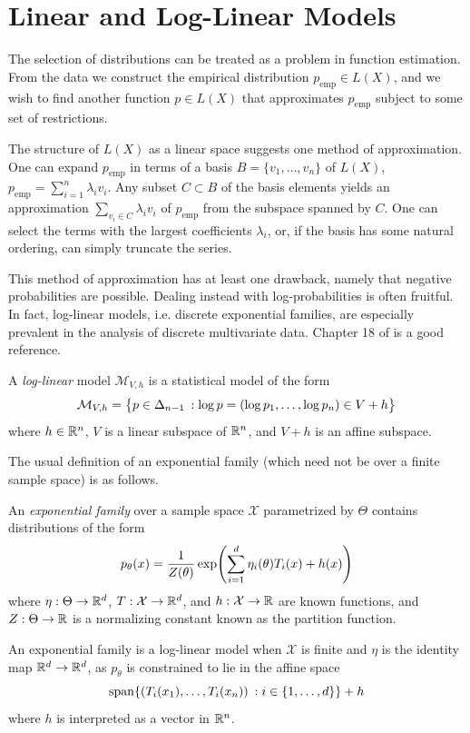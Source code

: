 \documentclass[cclicense]{hmcthesis}
\providecommand*{\xs}{\mathcal X}
\providecommand*{\ms}{\mathcal M}
\newcommand*{\emp}{\mathrm{emp}}
\numberwithin{equation}{chapter}
\numberwithin{thmcounter}{chapter}
\begin{document}
\section{Linear and Log-Linear Models}
    \label{sec:linear-models}
    
    The selection of distributions can be treated as a problem in function
    estimation.  From the data we construct the empirical distribution \mbox{$p_\emp
    \in L(X)$}, and we wish to find another function $p \in L(X)$ that
    approximates $p_\emp$ subject to some set of restrictions.  
    
    The structure of $L(X)$ as a linear space suggests one method of
    approximation.  One can expand $p_\emp$ in terms of a basis $B = \{v_1,
    \ldots, v_n\}$ of $L(X)$, $p_\emp = \sum_{i=1}^n \lambda_i v_i$.  Any subset
    $C \subset B$ of the basis elements yields an approximation $\sum_{v_i \in
    C} \lambda_i v_i$ of $p_\emp$ from the subspace spanned by $C$.  One can
    select the terms with the largest coefficients $\lambda_i$, or, if the basis
    has some natural ordering, can simply truncate the series.

    This method of approximation has at least one drawback, namely that negative
    probabilities are possible.  Dealing instead with log-probabilities is often
    fruitful.  In fact, log-linear models, i.e. discrete exponential families,
    are especially prevalent in the analysis of discrete multivariate data.
    Chapter 18 of \citep{AOS} is a good reference.
    \begin{definition}
        A \emph{log-linear} model $\ms_{V,h}$ is a statistical model of the form
        \[
            \ms_{V,h} = \cdel[\big]{p \in \Delta_{n-1} \:: \log p = (\log p_1, \ldots,
            \log p_n) \in V + h}
        \]
        where $h \in \mathbb{R}^n$, $V$ is a linear subspace of $\mathbb{R}^n$, and $V + h$ is
        an affine subspace.
    \end{definition}

    The usual definition of an exponential family (which need not be over a
    finite sample space) is as follows.
    \begin{definition}
        An \emph{exponential family} over a sample space $\xs$ parametrized by
        $\Theta$ contains distributions of the form
        \[
            p_\theta(x) = 
            \frac 1 {Z(\theta)}
            \exp\pdel*{
                \displaystyle \sum_{i=1}^d \eta_i(\theta)T_i(x) + h(x)
            }
        \]
        where $\eta : \Theta \to \mathbb{R}^d$, $T:\xs \to \R^d$, and $h: \xs \to \R$
        are known functions, and $Z:\Theta \to \mathbb{R}$ is a normalizing constant
        known as the partition function.
    \end{definition}
    An exponential family is a log-linear model when $\xs$ is finite and $\eta$
    is the identity map $\mathbb{R}^d \to \mathbb{R}^d$, as $p_\theta$ is constrained to lie in
    the affine space
    \[
        \mathrm{span}\cdel*{
            (T_i(x_1), \ldots, T_i(x_n)) \:: i \in \{1, \ldots, d\}
        } + h
    \]
    where $h$ is interpreted as a vector in $\mathbb{R}^n$.  
\end{document}
